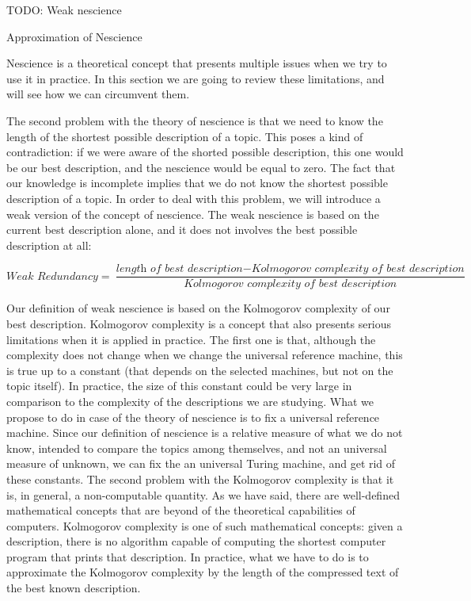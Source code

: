 {\color{red} TODO: Weak nescience}


{\color{red} Approximation of Nescience}

Nescience is a theoretical concept that presents multiple issues when we try to use it in practice. In this section we are going to review these limitations, and will see how we can circumvent them.

The second problem with the theory of nescience is that we need to know the length of the shortest possible description of a topic. This poses a kind of contradiction: if we were aware of the shorted possible description, this one would be our best description, and the nescience would be equal to zero. The fact that our knowledge is incomplete implies that we do not know the shortest possible description of a topic. In order to deal with this problem, we will introduce a weak version of the concept of nescience. The weak nescience is based on the current best description alone, and it does not involves the best possible description at all:

\[
\textit{Weak Redundancy} = \frac{\textit{length of best description} - \textit{Kolmogorov complexity of best description}}{\textit{Kolmogorov complexity of best description}}
\]

Our definition of weak nescience is based on the Kolmogorov complexity of our best description. Kolmogorov complexity is a concept that also presents serious limitations when it is applied in practice. The first one is that, although the complexity does not change when we change the universal reference machine, this is true up to a constant (that depends on the selected machines, but not on the topic itself). In practice, the size of this constant could be very large in comparison to the complexity of the descriptions we are studying. What we propose to do in case of the theory of nescience is to fix a universal reference machine. Since our definition of nescience is a relative measure of what we do not know, intended to compare the topics among themselves, and not an universal measure of unknown, we can fix the an universal Turing machine, and get rid of these constants. The second problem with the Kolmogorov complexity is that it is, in general, a non-computable quantity. As we have said, there are well-defined mathematical concepts that are beyond of the theoretical capabilities of computers. Kolmogorov complexity is one of such mathematical concepts: given a description, there is no algorithm capable of computing the shortest computer program that prints that description. In practice, what we have to do is to approximate the Kolmogorov complexity by the length of the compressed text of the best known description.

